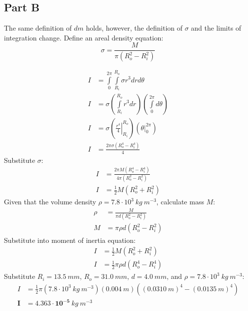 \documentclass{article}
\begin{document}
\subsection*{Part B}
    \begin{figure}[H]
        \centering
    \end{figure}
    The same definition of $dm$ holds, however, the definition of $\sigma$ and
    the limits of integration change. Define an areal density equation:
    $$\sigma=\frac{M}{\pi (R^{2}_{o}-R^{2}_{i})}$$
    
    \begin{align*}
        I&=\int\limits_{0}^{2\pi}\int\limits_{R_i}^{R_o}\sigma r^{3}drd\theta\\
        I&=\sigma\left(\int\limits_{R_i}^{R_o}r^{3}dr\right)\left(\int\limits_{0}^{2\pi}d\theta\right)\\
        I&=\sigma\left(\left.\frac{r^{4}}{4}\right\vert^{R_o}_{R_i}\right)\left(\left.\theta\right\vert^{2\pi}_{0}\right)\\
        I&=\frac{2\pi\sigma (R^{4}_{o}-R^{4}_{i})}{4}
    \end{align*}
    Substitute $\sigma$:
    \begin{align*}
        I&=\frac{2\pi M (R^{4}_{o}-R^{4}_{i})}{4\pi (R^{2}_{o}-R^{2}_{i})}\\
        I&=\frac{1}{2}M (R^{2}_{o}+R^{2}_{i})
    \end{align*}
    Given that the volume density $\rho=7.8\cdot10^{3}\ \si{kg\ m^{-3}}$, calculate mass $M$:
    \begin{align*}
        \rho&=\frac{M}{\pi d(R^{2}_{o}-R^{2}_{i})}\\
        M&=\pi \rho d(R^{2}_{o}-R^{2}_{i})
    \end{align*}
    Substitute into moment of inertia equation:
    \begin{align*}
        I&=\frac{1}{2}M (R^{2}_{o}+R^{2}_{i})\\
        I&=\frac{1}{2}\pi \rho d(R^{4}_{o}-R^{4}_{i})
    \end{align*}
    Substitute $R_{i}=13.5\ \si{mm}$, $R_{o}=31.0\ \si{mm}$, $d=4.0\ \si{mm}$, and $\rho=7.8\cdot10^{3}\ \si{kg\ m^{-3}}$:
    \begin{align*}
        I&=\frac{1}{2}\pi (7.8\cdot10^{3}\ \si{kg\ m^{-3}}) (0.004\ \si{m})((0.0310\ \si{m})^{4}-(0.0135\ \si{m})^{4})\\
        \bm{I}&\bm{=4.363\cdot 10^{-5}}\ \si{kg\ m^{-3}}
    \end{align*}
    
\end{document}
